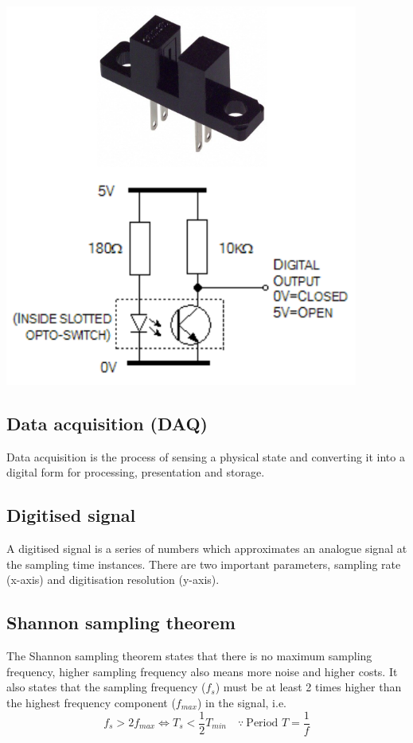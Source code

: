 \documentclass[11pt]{article}
\begin{document}
\begin{center}
\includegraphics[scale=1]{./images/slotted-opto-switch.png}
\end{center}

\subsection{Data acquisition (DAQ)}
\label{sec:org66d66a4}
Data acquisition is the process of sensing a physical state and converting it into a digital form for processing, presentation and storage.

\subsection{Digitised signal}
\label{sec:org396cb10}
A digitised signal is a series of numbers which approximates an analogue signal at the sampling time instances. There are two important parameters, sampling rate (x-axis) and digitisation resolution (y-axis).

\subsection{Shannon sampling theorem}
\label{sec:org4f17a56}
The Shannon sampling theorem states that there is no maximum sampling frequency, higher sampling frequency also means more noise and higher costs. It also states that the sampling frequency (\(f_s\)) must be at least 2 times higher than the highest frequency component (\(f_{max}\)) in the signal, i.e.
\[f_s > 2f_{max} \Longleftrightarrow T_s < \frac{1}{2} T_{min} \quad \because \ \text{Period } T = \frac{1}{f}\]
\end{document}
